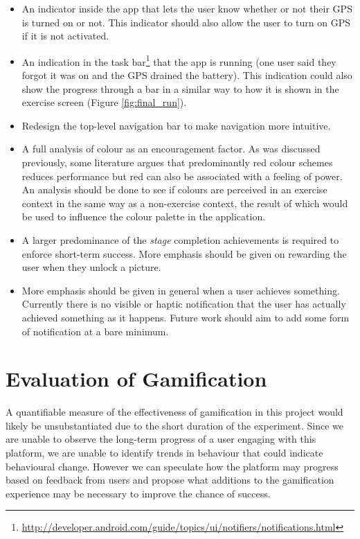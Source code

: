 \begin{itemize}
  \item An indicator inside the app that lets the user know whether or
    not their GPS is turned on or not. This indicator should also
    allow the user to turn on GPS if it is not activated.
  \item An indication in the task
    bar\footnote{\url{http://developer.android.com/guide/topics/ui/notifiers/notifications.html}}
    that the app is running (one user said they forgot it was on and
    the GPS drained the battery). This indication could also show the
    progress through a bar in a similar way to how it is shown in the
    exercise screen (Figure \ref{fig:final_run}).
  \item Redesign the top-level navigation bar to make navigation more
    intuitive. 
  \item A full analysis of colour as an encouragement factor. As was
    discussed previously, some literature argues that predominantly
    red colour schemes reduces performance\cite{colours_red} but red
    can also be associated with a feeling of power. An analysis should
    be done to see if colours are perceived in an exercise context in
    the same way as a non-exercise context, the result of which would
    be used to influence the colour palette in the application.
  \item A larger predominance of the \emph{stage} completion
    achievements is required to enforce short-term success. More
    emphasis should be given on rewarding the user  when they unlock a
    picture. 
  \item More emphasis should be given in general when a user achieves
    something. Currently there is no visible or haptic notification
    that the user has actually achieved something as it
    happens. Future work should aim to add some form of notification
    at a bare minimum.
\end{itemize}

\section{Evaluation of Gamification}
A quantifiable measure of the effectiveness of gamification in this
project would likely be unsubstantiated due to the short duration of 
the experiment. Since we are unable to observe the long-term progress
of a user engaging with this platform, we are unable to identify
trends in behaviour that could indicate behavioural change. However we
can speculate how the platform may progress based on feedback from
users and propose what additions to the gamification experience may be
necessary to improve the chance of success.

